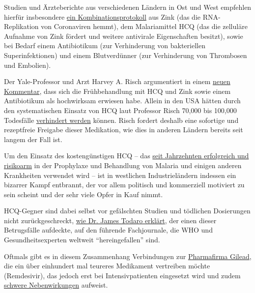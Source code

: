 Studien und Ärzteberichte aus verschiedenen Ländern in Ost und West
empfehlen hierfür insbesondere
\href{https://swprs.org/zur-behandlung-von-covid-19/}{ein
Kombinationsprotokoll} aus Zink (das die RNA-Replikation von Coronaviren
hemmt), dem Malariamittel HCQ (das die zelluläre Aufnahme von Zink
fördert und weitere antivirale Eigenschaften besitzt), sowie bei Bedarf
einem Antibiotikum (zur Verhinderung von bakteriellen Superinfektionen)
und einem Blutverdünner (zur Verhinderung von Thrombosen und Embolien).

Der Yale-Professor und Arzt Harvey A. Risch argumentiert in einem
\href{https://www.newsweek.com/key-defeating-covid-19-already-exists-we-need-start-using-it-opinion-1519535}{neuen
Kommentar}, dass sich die Frühbehandlung mit HCQ und Zink sowie einem
Antibiotikum als hochwirksam erwiesen habe. Allein in den USA hätten
durch den systematischen Einsatz von HCQ laut Professor Risch 70,000 bis
100,000 Todesfälle
\href{https://www.foxnews.com/media/hydroxychloroquine-could-save-lives-ingraham-yale-professor}{verhindert
werden} können. Risch fordert deshalb eine sofortige und rezeptfreie
Freigabe dieser Medikation, wie dies in anderen Ländern bereits seit
langem der Fall ist.

Um den Einsatz des kostengünstigen HCQ -- das
\href{https://swprs.files.wordpress.com/2020/07/hcq-white-paper-dr-simone-gold.pdf}{seit
Jahrzehnten erfolgreich und risikoarm} in der Prophylaxe und Behandlung
von Malaria und einigen anderen Krankheiten verwendet wird -- ist in
westlichen Industrieländern indessen ein bizarrer Kampf entbrannt, der
vor allem politisch und kommerziell motiviert zu sein scheint und der
sehr viele Opfer in Kauf nimmt.

HCQ-Gegner sind dabei selbst vor gefälschten Studien und tödlichen
Dosierungen nicht zurückgeschreckt,
\href{https://www.medicineuncensored.com/a-study-out-of-thin-air}{wie
Dr. James Todaro erklärt}, der einen dieser Betrugsfälle aufdeckte, auf
den führende Fachjournale, die WHO und Gesundheitsexperten weltweit
``hereingefallen'' sind.

Oftmals gibt es in diesem Zusammenhang Verbindungen zur
\href{https://omnij.org/Gilead:_Twenty-one_billion_reasons_to_discredit_hydroxychloroquine_(ORIGINAL_ARTICLE)}{Pharmafirma
Gilead}, die ein über einhundert mal teureres Medikament vertreiben
möchte (Remdesivir), das jedoch erst bei Intensivpatienten eingesetzt
wird und zudem
\href{https://www.sciencedirect.com/science/article/pii/S1201971220305282}{schwere
Nebenwirkungen} aufweist.

